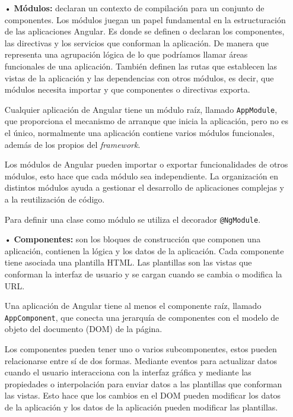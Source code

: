 \documentclass[a4paper, 12pt]{book}
\begin{document}
\begin{itemize}

	\item[•] \textbf{Módulos:} declaran un contexto de compilación para un conjunto de componentes. 
	Los módulos juegan un papel fundamental en la estructuración de las aplicaciones Angular. 
	Es donde se definen o declaran los componentes, las directivas y los servicios que conforman la aplicación. 
	De manera que representa una agrupación lógica de lo que podríamos llamar áreas funcionales de una aplicación. 
	También definen las rutas que establecen las vistas de la aplicación y las dependencias con otros módulos, es decir, que módulos necesita importar y que componentes o directivas exporta. 
	
	Cualquier aplicación de Angular tiene un módulo raíz, llamado \texttt{AppModule}, que proporciona el mecanismo de arranque que inicia la aplicación, pero no es el único, normalmente una aplicación contiene varios módulos funcionales, además de los propios del \emph{framework}. 
	
	Los módulos de Angular pueden importar o exportar funcionalidades de otros módulos, esto hace que cada módulo sea independiente. 
	La organización en distintos módulos ayuda a gestionar el desarrollo de aplicaciones complejas y a la reutilización de código.
	
	Para definir una clase como módulo se utiliza el decorador \texttt{@NgModule}.
	
	\item[•] \textbf{Componentes:} son los bloques de construcción que componen una aplicación, contienen la lógica y los datos de la aplicación. 
	Cada componente tiene asociada una plantilla HTML. Las plantillas son las vistas que conforman la interfaz de usuario y se cargan cuando se cambia o modifica la URL.
	
	Una aplicación de Angular tiene al menos el componente raíz, llamado \texttt{AppComponent}, que conecta una jerarquía de componentes con el modelo de objeto del documento (DOM) de la página.
	
	Los componentes pueden tener uno o varios subcomponentes, estos pueden relacionarse entre sí de dos formas. 
	Mediante eventos para actualizar datos cuando el usuario interacciona con la interfaz gráfica y mediante las propiedades o interpolación para enviar datos a las plantillas que conforman las vistas. 
	Esto hace que los cambios en el DOM pueden modificar los datos de la aplicación y los datos de la aplicación pueden modificar las plantillas.
	

\end{itemize}
\end{document}
